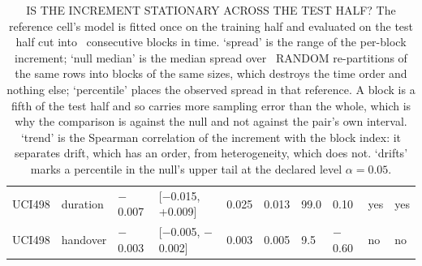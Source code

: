 \begin{table}[t]
{\begin{tabular}{llllllllll}
UCI498 & duration & $-$0.007 & [$-$0.015, +0.009] & 0.025 & 0.013 & 99.0 & 0.10 & yes & yes \\
UCI498 & handover & $-$0.003 & [$-$0.005, $-$0.002] & 0.003 & 0.005 & 9.5 & $-$0.60 & no & no \\
\bottomrule
\end{tabular}%
}
\caption{IS THE INCREMENT STATIONARY ACROSS THE TEST HALF? The reference cell's model is fitted once on the training half and evaluated on the test half cut into \nDriftBlocks\ consecutive blocks in time. `spread' is the range of the per-block increment; `null median' is the median spread over \nDriftPerm\ RANDOM re-partitions of the same rows into blocks of the same sizes, which destroys the time order and nothing else; `percentile' places the observed spread in that reference. A block is a fifth of the test half and so carries more sampling error than the whole, which is why the comparison is against the null and not against the pair's own interval. `trend' is the Spearman correlation of the increment with the block index: it separates drift, which has an order, from heterogeneity, which does not. `drifts' marks a percentile in the null's upper tail at the declared level $\alpha = 0.05$.}
\label{tab:drift}
\end{table}
